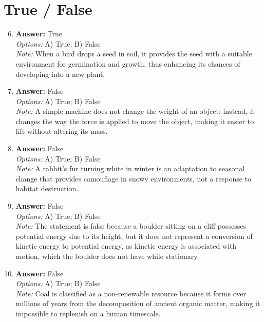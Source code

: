 \documentclass[12pt]{article}
\begin{document}
\section*{True / False}
\begin{enumerate}[label=\arabic*.]
\setcounter{enumi}{5}
\item \textbf{Answer:} True
\\ \textit{Options:} A) True; B) False
\\ \textit{Note:} When a bird drops a seed in soil, it provides the seed with a suitable environment for germination and growth, thus enhancing its chances of developing into a new plant.
\item \textbf{Answer:} False
\\ \textit{Options:} A) True; B) False
\\ \textit{Note:} A simple machine does not change the weight of an object; instead, it changes the way the force is applied to move the object, making it easier to lift without altering its mass.
\item \textbf{Answer:} False
\\ \textit{Options:} A) True; B) False
\\ \textit{Note:} A rabbit's fur turning white in winter is an adaptation to seasonal change that provides camouflage in snowy environments, not a response to habitat destruction.
\item \textbf{Answer:} False
\\ \textit{Options:} A) True; B) False
\\ \textit{Note:} The statement is false because a boulder sitting on a cliff possesses potential energy due to its height, but it does not represent a conversion of kinetic energy to potential energy, as kinetic energy is associated with motion, which the boulder does not have while stationary.
\item \textbf{Answer:} False
\\ \textit{Options:} A) True; B) False
\\ \textit{Note:} Coal is classified as a non-renewable resource because it forms over millions of years from the decomposition of ancient organic matter, making it impossible to replenish on a human timescale.
\end{enumerate}
\end{document}
